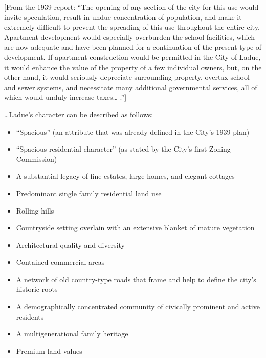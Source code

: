[From the 1939 report: ``The opening of any section of the city for this use
would invite speculation, result in undue concentration of population, and make
it extremely difficult to prevent the spreading of this use throughout the
entire city. Apartment development would especially overburden the school
facilities, which are now adequate and have been planned for a continuation of
the present type of development. If apartment construction would be permitted in
the City of Ladue, it would enhance the value of the property of a few
individual owners, but, on the other hand, it would seriously depreciate
surrounding property, overtax school and sewer systems, and necessitate many
additional governmental services, all of which would unduly increase taxes\ldots
.'']

\ldots Ladue's character can be described as follows:
\begin{itemize}
\item ``Spacious'' (an attribute that was already defined in the City's 1939
plan)

\item ``Spacious residential character'' (as stated by the City's first Zoning
Commission)


\item A substantial legacy of fine estates, large homes, and elegant cottages

\item Predominant single family residential land use

\item Rolling hills

\item Countryside setting overlain with an extensive blanket of mature
vegetation

\item Architectural quality and diversity

\item Contained commercial areas

\item A network of old country-type roads that frame and help to define the
city's historic roots

\item A demographically concentrated community of civically prominent and active
residents


\item A multigenerational family heritage

\item Premium land values
\end{itemize}

